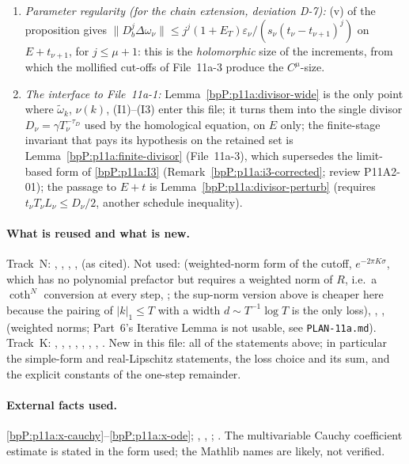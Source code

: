 \begin{enumerate}[label=(T\arabic*)]
\item \emph{Parameter regularity (for the chain extension, deviation D-7):} (v) of the proposition gives $\lVert D_b^j\Delta\omega_\nu\rVert\le j^j(1+E_T)\varepsilon_\nu/(s_\nu(t_\nu-t_{\nu+1})^j)$ on $E+t_{\nu+1}$, for $j\le\mu+1$: this is the \emph{holomorphic} size of the increments, from which the mollified cut-offs of File~11a-3 produce the $C^\mu$-size.
\item \emph{The interface to File~11a-1:} Lemma~\ref{bpP:p11a:divisor-wide} is the only point where $\tilde\omega_k$, $\nu(k)$, (I1)--(I3) enter this file; it turns them into the single divisor $D_\nu=\gamma T_\nu^{-\tau_D}$ used by the homological equation, on $E$ only; the finite-stage invariant that pays its hypothesis on the retained set is Lemma~\ref{bpP:p11a:finite-divisor} (File~11a-3), which supersedes the limit-based form of \ref{bpP:p11a:I3} (Remark~\ref{bpP:p11a:i3-corrected}; review P11A2-01); the passage to $E+t$ is Lemma~\ref{bpP:p11a:divisor-perturb} (requires $t_\nu T_\nu L_\nu\le D_\nu/2$, another schedule inequality).
\end{enumerate}

\paragraph{What is reused and what is new.} Track~N: , , , ,  (as cited). Not used:  (weighted-norm form of the cutoff, $e^{-2\pi K\sigma}$, which has no polynomial prefactor but requires a weighted norm of $R$, i.e.\ a $\coth^N$ conversion at every step, ; the sup-norm version above is cheaper here because the pairing of $\lvert k\rvert_1\le T$ with a width $d\sim T^{-1}\log T$ is the only loss), , ,  (weighted norms; Part~6's Iterative Lemma is not usable, see \texttt{PLAN-11a.md}). Track~K: , , , , , , , . New in this file: all of the statements above; in particular the simple-form and real-Lipschitz statements, the loss choice and its sum, and the explicit constants of the one-step remainder.

\paragraph{External facts used.} \ref{bpP:p11a:x-cauchy}--\ref{bpP:p11a:x-ode}; , , ; . The multivariable Cauchy coefficient estimate is stated in the form used; the Mathlib names are likely, not verified.

